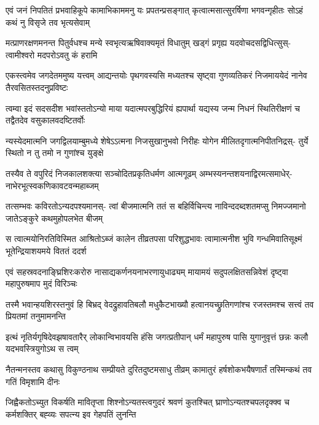 \fourlineindentedshloka
{एवं जनं निपतितं प्रभवाहिकूपे}
{कामाभिकाममनु यः प्रपतन्प्रसङ्गात्}
{कृत्वात्मसात्सुरर्षिणा भगवन्गृहीतः}
{सोऽहं कथं नु विसृजे तव भृत्यसेवाम्} %

\fourlineindentedshloka
{मत्प्राणरक्षणमनन्त पितुर्वधश्च}
{मन्ये स्वभृत्यऋषिवाक्यमृतं विधातुम्}
{खड्गं प्रगृह्य यदवोचदसद्विधित्सुस्-}
{त्वामीश्वरो मदपरोऽवतु कं हरामि} %

\fourlineindentedshloka
{एकस्त्वमेव जगदेतममुष्य यत्त्वम्}
{आद्यन्तयोः पृथगवस्यसि मध्यतश्च}
{सृष्ट्वा गुणव्यतिकरं निजमाययेदं}
{नानेव तैरवसितस्तदनुप्रविष्टः} %

\fourlineindentedshloka
{त्वम्वा इदं सदसदीश भवांस्ततोऽन्यो}
{माया यदात्मपरबुद्धिरियं ह्यपार्था}
{यद्यस्य जन्म निधनं स्थितिरीक्षणं च}
{तद्वैतदेव वसुकालवदष्टितर्वोः} %

\fourlineindentedshloka
{न्यस्येदमात्मनि जगद्विलयाम्बुमध्ये}
{शेषेऽऽत्मना निजसुखानुभवो निरीहः}
{योगेन मीलितदृगात्मनिपीतनिद्रस्-}
{तुर्ये स्थितो न तु तमो न गुणांश्च युङ्क्षे} %

\fourlineindentedshloka
{तस्यैव ते वपुरिदं निजकालशक्त्या}
{सञ्चोदितप्रकृतिधर्मण आत्मगूढम्}
{अम्भस्यनन्तशयनाद्विरमत्समाधेर्-}
{नाभेरभूत्स्वकणिकावटवन्महाब्जम्} %

\fourlineindentedshloka
{तत्सम्भवः कविरतोऽन्यदपश्यमानस्-}
{त्वां बीजमात्मनि ततं स बहिर्विचिन्त्य}
{नाविन्ददब्दशतमप्सु निमज्जमानो}
{जातेऽङ्कुरे कथमुहोपलभेत बीजम्} %

\fourlineindentedshloka
{स त्वात्मयोनिरतिविस्मित आश्रितोऽब्जं}
{कालेन तीव्रतपसा परिशुद्धभावः}
{त्वामात्मनीश भुवि गन्धमिवातिसूक्ष्मं}
{भूतेन्द्रियाशयमये विततं ददर्श} %

\fourlineindentedshloka
{एवं सहस्रवदनाङ्घ्रिशिरःकरोरु}
{नासाद्यकर्णनयनाभरणायुधाढ्यम्}
{मायामयं सदुपलक्षितसन्निवेशं}
{दृष्ट्वा महापुरुषमाप मुदं विरिञ्चः} %

\fourlineindentedshloka
{तस्मै भवान्हयशिरस्तनुवं हि बिभ्रद्}
{वेदद्रुहावतिबलौ मधुकैटभाख्यौ}
{हत्वानयच्छ्रुतिगणांश्च रजस्तमश्च}
{सत्त्वं तव प्रियतमां तनुमामनन्ति} %

\fourlineindentedshloka
{इत्थं नृतिर्यगृषिदेवझषावतारैर्}
{लोकान्विभावयसि हंसि जगत्प्रतीपान्}
{धर्मं महापुरुष पासि युगानुवृत्तं}
{छन्नः कलौ यदभवस्त्रियुगोऽथ स त्वम्} %

\fourlineindentedshloka
{नैतन्मनस्तव कथासु विकुण्ठनाथ}
{सम्प्रीयते दुरितदुष्टमसाधु तीव्रम्}
{कामातुरं हर्षशोकभयैषणार्तं}
{तस्मिन्कथं तव गतिं विमृशामि दीनः} %

\fourlineindentedshloka
{जिह्वैकतोऽच्युत विकर्षति मावितृप्ता}
{शिश्नोऽन्यतस्त्वगुदरं श्रवणं कुतश्चित्}
{घ्राणोऽन्यतश्चपलदृक्क्व च कर्मशक्तिर्}
{बह्व्यः सपत्न्य इव गेहपतिं लुनन्ति} %

